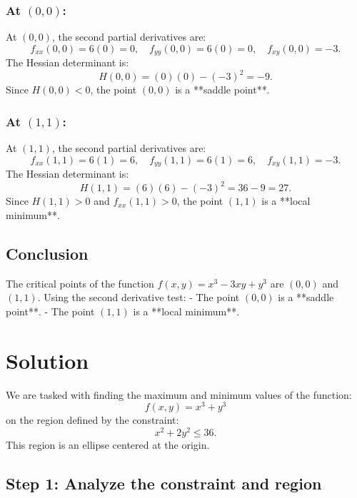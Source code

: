 \documentclass[11pt]{article}
\begin{document}
\newpage

\subsubsection{At \( (0, 0) \):}

At \( (0, 0) \), the second partial derivatives are:
\[
f_{xx}(0, 0) = 6(0) = 0, \quad f_{yy}(0, 0) = 6(0) = 0, \quad f_{xy}(0, 0) = -3.
\]
The Hessian determinant is:
\[
H(0, 0) = (0)(0) - (-3)^2 = -9.
\]
Since \( H(0, 0) < 0 \), the point \( (0, 0) \) is a **saddle point**.

\newpage

\subsubsection{At \( (1, 1) \):}

At \( (1, 1) \), the second partial derivatives are:
\[
f_{xx}(1, 1) = 6(1) = 6, \quad f_{yy}(1, 1) = 6(1) = 6, \quad f_{xy}(1, 1) = -3.
\]
The Hessian determinant is:
\[
H(1, 1) = (6)(6) - (-3)^2 = 36 - 9 = 27.
\]
Since \( H(1, 1) > 0 \) and \( f_{xx}(1, 1) > 0 \), the point \( (1, 1) \) is a **local minimum**.

\newpage

\subsection{Conclusion}

The critical points of the function \( f(x, y) = x^3 - 3xy + y^3 \) are \( (0, 0) \) and \( (1, 1) \). Using the second derivative test:
- The point \( (0, 0) \) is a **saddle point**.
- The point \( (1, 1) \) is a **local minimum**.




\newpage

\section{Solution}

We are tasked with finding the maximum and minimum values of the function:
\[
f(x, y) = x^3 + y^3
\]
on the region defined by the constraint:
\[
x^2 + 2y^2 \leq 36.
\]
This region is an ellipse centered at the origin.

\newpage

\subsection{Step 1: Analyze the constraint and region}
\end{document}

